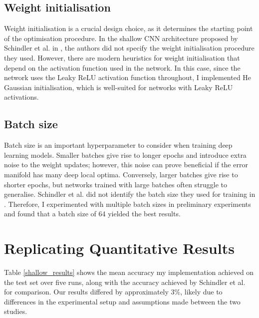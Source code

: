 \documentclass[conference]{IEEEtran}
\begin{document}
\subsection{Weight initialisation}

Weight initialisation is a crucial design choice, as it determines the starting point of the optimisation procedure.
In the shallow CNN architecture proposed by Schindler et al. in \cite{SchindlerLidyRauber}, the authors did not specify the weight initialisation procedure they used.
However, there are modern heuristics for weight initialisation that depend on the activation function used in the network.
In this case, since the network uses the Leaky ReLU activation function throughout, I implemented He Gaussian initialisation, which is well-suited for networks with Leaky ReLU activations.

\subsection{Batch size}

Batch size is an important hyperparameter to consider when training deep learning models.
Smaller batches give rise to longer epochs and introduce extra noise to the weight updates; however, this noise can prove beneficial if the error manifold has many deep local optima.
Conversely, larger batches give rise to shorter epochs, but networks trained with large batches often struggle to generalise.
Schindler et al. did not identify the batch size they used for training in \cite{SchindlerLidyRauber}.
Therefore, I experimented with multiple batch sizes in preliminary experiments and found that a batch size of 64 yielded the best results.

\section{Replicating Quantitative Results}

Table \ref{shallow_results} shows the mean accuracy my implementation achieved on the test set over five runs, along with the accuracy achieved by Schindler et al. \cite{SchindlerLidyRauber} for comparison.
Our results differed by approximately 3\%, likely due to differences in the experimental setup and assumptions made between the two studies.
\end{document}
